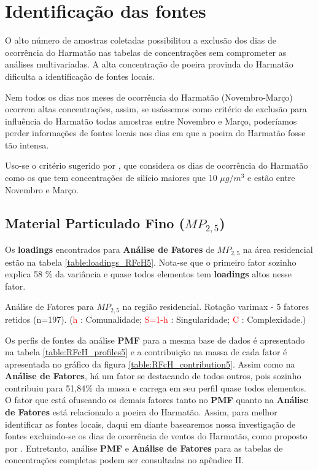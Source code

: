 \section{Identificação das fontes}

O alto número de amostras coletadas possibilitou a exclusão dos dias de 
ocorrência do Harmatão nas tabelas de concentrações sem comprometer as análises
multivariadas. A alta concentração de poeira provinda do Harmatão dificulta a 
identificação de fontes locais.

Nem todos os dias nos meses de ocorrência do Harmatão (Novembro-Março) 
ocorrem altas concentrações, assim, se usássemos como critério de exclusão para 
influência do Harmatão todas amostras entre Novembro e Março, poderíamos
perder informações de fontes locais nos dias em que a poeira do Harmatão fosse
tão intensa. 

Uso-se o critério sugerido por \cite{aboh2009}, que considera os dias de 
ocorrência do Harmatão como os que tem concentrações de silício maiores que 
10 $\mu g/m^3$ e estão entre Novembro e Março.

\subsection{Material Particulado Fino ($MP_{2,5}$)}

Os \textbf{loadings} encontrados para \textbf{Análise de Fatores} de $MP_{2,5}$
na área residencial estão na tabela \ref{table:loadings_RFcH5}. 
Nota-se que o primeiro fator sozinho explica 58 \% da variância e quase todos 
elementos tem \textbf{loadings} altos nesse fator. 

\begin{table}[H]
  
  \caption{Análise de Fatores para $MP_{2,5}$ na região residencial.
           Rotação varimax - 5 fatores retidos (n=197).
           (\textcolor{red}{h} : Comunalidade; 
           \textcolor{red}{S=1-h} : Singularidade; 
           \textcolor{red}{C} : Complexidade.)
           \label{table:loadings_RFcH5}}
\end{table}

Os perfis de fontes da análise \textbf{PMF} para a mesma base de dados é 
apresentado na tabela \ref{table:RFcH_profiles5} e a contribuição na massa
de cada fator é apresentada no gráfico da figura \ref{table:RFcH_contribution5}.
Assim como na \textbf{Análise de Fatores}, há um fator se destacando de todos
outros, pois sozinho contribuiu para 51,84\% da massa e carrega em seu perfil
quase todos elementos. O fator que está ofuscando os demais fatores
tanto no \textbf{PMF} quanto na \textbf{Análise de Fatores} está relacionado
a poeira do Harmatão. 
Assim, para melhor identificar as fontes locais, daqui em diante basearemos 
nossa investigação de fontes excluindo-se os dias de ocorrência de ventos do 
Harmatão, como proposto por \cite{aboh2009}. Entretanto, análise \textbf{PMF} e 
\textbf{Análise de Fatores} para as tabelas de concentrações completas podem
ser consultadas no apêndice II. 


